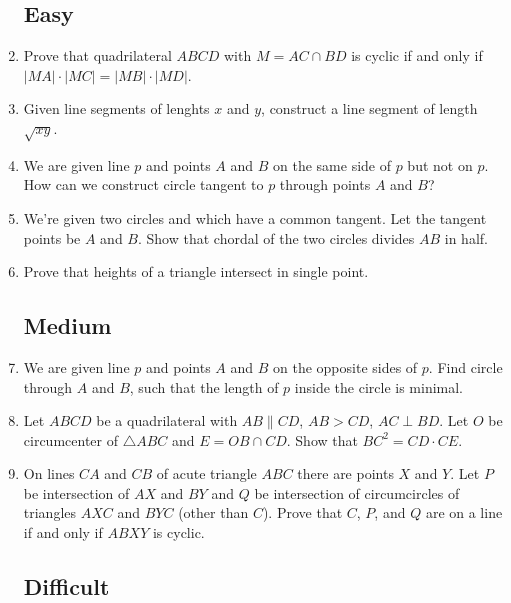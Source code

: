 \documentclass[11pt,a5paper]{article}
\begin{document}
\begin{enumerate}
\subsection*{Easy}
    \item{Prove that quadrilateral $ABCD$ with $M = AC \cap BD$ is cyclic if and only if $|MA|\cdot|MC| = |MB|\cdot|MD|$.}
    
    \item{Given line segments of lenghts $x$ and $y$, construct a line segment of length $\sqrt{xy}$.}

	\item{We are given line $p$ and points $A$ and $B$ on the same side of $p$ but not on $p$. How can we construct circle tangent to $p$ through points $A$ and $B$?}
	
		\item{We're given two circles and which have a common tangent. Let the tangent points be $A$ and $B$. Show that chordal of the two circles divides $AB$ in half.}
		
		\item{Prove that heights of a triangle intersect in single point.}
	
\subsection*{Medium}

	\item{We are given line $p$ and points $A$ and $B$ on the opposite sides of $p$. Find circle through $A$ and $B$, such that the length of $p$ inside the circle is minimal.}

	\item{Let $ABCD$ be a quadrilateral with $AB \parallel CD$, $AB > CD$, $AC \perp BD$. Let $O$ be circumcenter of $\triangle ABC$ and $E = OB \cap CD$. Show that $BC^2 = CD \cdot CE$.}
	
	\item{On lines $CA$ and $CB$ of acute triangle $ABC$ there are points $X$ and $Y$. Let $P$ be intersection of $AX$ and $BY$ and $Q$ be intersection of circumcircles of triangles $AXC$ and $BYC$ (other than $C$). Prove that $C$, $P$, and $Q$ are on a line if and only if $ABXY$ is cyclic.}
	
	\subsection*{Difficult}
	

\end{enumerate}
\end{document}
